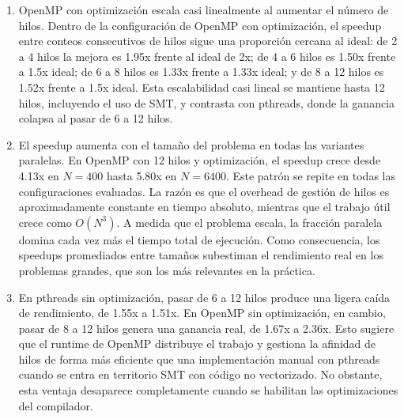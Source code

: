 \begin{enumerate}
    \item OpenMP con optimización escala casi linealmente al aumentar el número de hilos.  
    Dentro de la configuración de OpenMP con optimización, el speedup entre conteos consecutivos de hilos sigue una proporción cercana al ideal: de 2 a 4 hilos la mejora es 1.95x frente al ideal de 2x; de 4 a 6 hilos es 1.50x frente a 1.5x ideal; de 6 a 8 hilos es 1.33x frente a 1.33x ideal; y de 8 a 12 hilos es 1.52x frente a 1.5x ideal. Esta escalabilidad casi lineal se mantiene hasta 12 hilos, incluyendo el uso de SMT, y contrasta con pthreads, donde la ganancia colapsa al pasar de 6 a 12 hilos.

    \item El speedup aumenta con el tamaño del problema en todas las variantes paralelas.  
    En OpenMP con 12 hilos y optimización, el speedup crece desde 4.13x en $N=400$ hasta 5.80x en $N=6400$. Este patrón se repite en todas las configuraciones evaluadas. La razón es que el overhead de gestión de hilos es aproximadamente constante en tiempo absoluto, mientras que el trabajo útil crece como $O(N^3)$. A medida que el problema escala, la fracción paralela domina cada vez más el tiempo total de ejecución. Como consecuencia, los speedups promediados entre tamaños subestiman el rendimiento real en los problemas grandes, que son los más relevantes en la práctica.

    \item En pthreads sin optimización, pasar de 6 a 12 hilos produce una ligera caída de rendimiento, de 1.55x a 1.51x. En OpenMP sin optimización, en cambio, pasar de 8 a 12 hilos genera una ganancia real, de 1.67x a 2.36x. Esto sugiere que el runtime de OpenMP distribuye el trabajo y gestiona la afinidad de hilos de forma más eficiente que una implementación manual con pthreads cuando se entra en territorio SMT con código no vectorizado. No obstante, esta ventaja desaparece completamente cuando se habilitan las optimizaciones del compilador.

\end{enumerate}